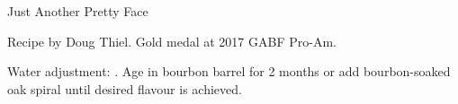 \begin{recipe}{Just Another Pretty Face} %

\begin{aboutblock}
Recipe by Doug Thiel. Gold medal at 2017 GABF Pro-Am.
\end{aboutblock}


\begin{methodandtiming}

\begin{mashsteps}
\end{mashsteps}

\begin{fermentationsteps}
\end{fermentationsteps}

\begin{directions}
Water adjustment: . Age in bourbon barrel for 2 months
or add bourbon-soaked oak spiral until desired flavour is achieved.
\end{directions}

\end{methodandtiming}

\recipebreak

\begin{ingredientsblock}

\begin{malts}
\end{malts}

\begin{hops}
\end{hops}


\end{ingredientsblock}

\end{recipe}

